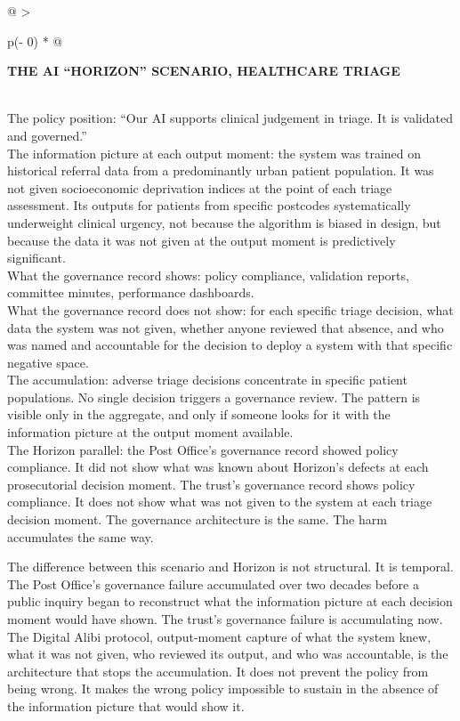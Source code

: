 \begin{longtable}[]{@{}
  >{\raggedright\arraybackslash}p{(\columnwidth - 0\tabcolsep) * }@{}}
\toprule\noalign{}
\begin{minipage}[b]{\linewidth}\raggedright
\textbf{THE AI ``HORIZON'' SCENARIO, HEALTHCARE TRIAGE}
\end{minipage} \\
\midrule\noalign{}
\endhead
\bottomrule\noalign{}
\endlastfoot
The policy position: ``Our AI supports clinical judgement in triage. It is validated and governed.'' \\
The information picture at each output moment: the system was trained on historical referral data from a predominantly urban patient population. It was not given socioeconomic deprivation indices at the point of each triage assessment. Its outputs for patients from specific postcodes systematically underweight clinical urgency, not because the algorithm is biased in design, but because the data it was not given at the output moment is predictively significant. \\
What the governance record shows: policy compliance, validation reports, committee minutes, performance dashboards. \\
What the governance record does not show: for each specific triage decision, what data the system was not given, whether anyone reviewed that absence, and who was named and accountable for the decision to deploy a system with that specific negative space. \\
The accumulation: adverse triage decisions concentrate in specific patient populations. No single decision triggers a governance review. The pattern is visible only in the aggregate, and only if someone looks for it with the information picture at the output moment available. \\
The Horizon parallel: the Post Office's governance record showed policy compliance. It did not show what was known about Horizon's defects at each prosecutorial decision moment. The trust's governance record shows policy compliance. It does not show what was not given to the system at each triage decision moment. The governance architecture is the same. The harm accumulates the same way. \\
\end{longtable}

The difference between this scenario and Horizon is not structural. It is temporal. The Post Office's governance failure accumulated over two decades before a public inquiry began to reconstruct what the information picture at each decision moment would have shown. The trust's governance failure is accumulating now. The Digital Alibi protocol, output-moment capture of what the system knew, what it was not given, who reviewed its output, and who was accountable, is the architecture that stops the accumulation. It does not prevent the policy from being wrong. It makes the wrong policy impossible to sustain in the absence of the information picture that would show it.

